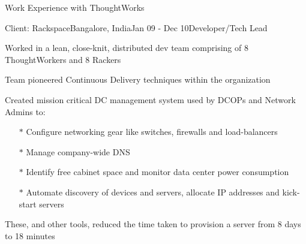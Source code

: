 \documentclass{resume} %
\begin{document}
\begin{rSection}{Work Experience with ThoughtWorks}

\begin{rSubsection}{Client: Rackspace}{Bangalore, India}{Jan 09 - Dec 10}{Developer/Tech Lead}
\item Worked in a lean, close-knit, distributed dev team comprising of 8 ThoughtWorkers and 8 Rackers
\item Team pioneered Continuous Delivery techniques within the organization
\item Created mission critical DC management system used by
  DCOPs and Network Admins to:
\vspace{-0.5em}
\begin{itemize}  \itemsep0.5pt \parskip0pt
    \item[$\ast$] Configure networking gear like switches, firewalls and load-balancers
    \item[$\ast$] Manage company-wide DNS
    \item[$\ast$] Identify free cabinet space and monitor data center power consumption
    \item[$\ast$] Automate discovery of devices and servers, allocate IP addresses and kick-start servers
\end{itemize}
\item These, and other tools, reduced the time taken to provision a server from 8 days to 18 minutes
\end{rSubsection}

\end{rSection}

\end{document}
